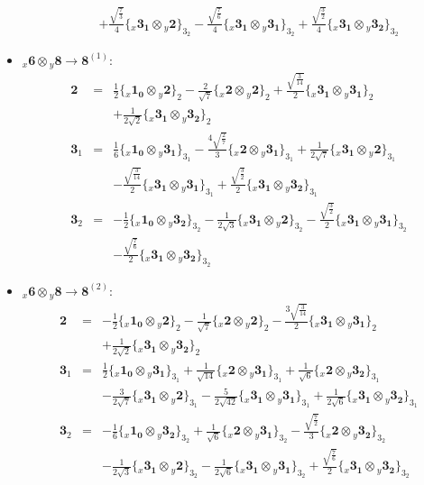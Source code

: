 \documentclass[english]{article}
\newcommand{\rep}[1]{\mathbf{#1}}
\newcommand{\repx}[2]{{}_{#2}\mathbf{#1}}
\newcommand{\subcg}[3]{\big\{ \repx{#1}{x}\otimes\repx{#2}{y}\big\}^{}_{#3}}
\begin{document}
\begin{itemize}
\begin{eqnarray*}
 & & +\frac{\sqrt{\frac{7}{3}}}{4}\subcg{3_{1}}{2}{3_{2}}-\frac{\sqrt{\frac{7}{6}}}{4}\subcg{3_{1}}{3_{1}}{3_{2}}+\frac{\sqrt{\frac{3}{2}}}{4}\subcg{3_{1}}{3_{2}}{3_{2}}
\end{eqnarray*}
\item $\repx{6}{x}\otimes\repx{8}{y}\to\rep{8}^{(1)}$:
\begin{eqnarray*}
\rep{2} &=& \frac{1}{2}\subcg{1_{0}}{2}{2}-\frac{2}{\sqrt{7}}\subcg{2}{2}{2}+\frac{\sqrt{\frac{3}{14}}}{2}\subcg{3_{1}}{3_{1}}{2} \\ 
 & & +\frac{1}{2 \sqrt{2}}\subcg{3_{1}}{3_{2}}{2}
\\
\rep{3}_{1} &=& \frac{1}{6}\subcg{1_{0}}{3_{1}}{3_{1}}-\frac{4 \sqrt{\frac{2}{7}}}{3}\subcg{2}{3_{1}}{3_{1}}+\frac{1}{2 \sqrt{7}}\subcg{3_{1}}{2}{3_{1}} \\ 
 & & -\frac{\sqrt{\frac{3}{14}}}{2}\subcg{3_{1}}{3_{1}}{3_{1}}+\frac{\sqrt{\frac{3}{2}}}{2}\subcg{3_{1}}{3_{2}}{3_{1}}
\\
\rep{3}_{2} &=& -\frac{1}{2}\subcg{1_{0}}{3_{2}}{3_{2}}-\frac{1}{2 \sqrt{3}}\subcg{3_{1}}{2}{3_{2}}-\frac{\sqrt{\frac{3}{2}}}{2}\subcg{3_{1}}{3_{1}}{3_{2}} \\ 
 & & -\frac{\sqrt{\frac{7}{6}}}{2}\subcg{3_{1}}{3_{2}}{3_{2}}
\end{eqnarray*}
\item $\repx{6}{x}\otimes\repx{8}{y}\to\rep{8}^{(2)}$:
\begin{eqnarray*}
\rep{2} &=& -\frac{1}{2}\subcg{1_{0}}{2}{2}-\frac{1}{\sqrt{7}}\subcg{2}{2}{2}-\frac{3 \sqrt{\frac{3}{14}}}{2}\subcg{3_{1}}{3_{1}}{2} \\ 
 & & +\frac{1}{2 \sqrt{2}}\subcg{3_{1}}{3_{2}}{2}
\\
\rep{3}_{1} &=& \frac{1}{2}\subcg{1_{0}}{3_{1}}{3_{1}}+\frac{1}{\sqrt{14}}\subcg{2}{3_{1}}{3_{1}}+\frac{1}{\sqrt{6}}\subcg{2}{3_{2}}{3_{1}} \\ 
 & & -\frac{3}{2 \sqrt{7}}\subcg{3_{1}}{2}{3_{1}}-\frac{5}{2 \sqrt{42}}\subcg{3_{1}}{3_{1}}{3_{1}}+\frac{1}{2 \sqrt{6}}\subcg{3_{1}}{3_{2}}{3_{1}}
\\
\rep{3}_{2} &=& -\frac{1}{6}\subcg{1_{0}}{3_{2}}{3_{2}}+\frac{1}{\sqrt{6}}\subcg{2}{3_{1}}{3_{2}}-\frac{\sqrt{\frac{7}{2}}}{3}\subcg{2}{3_{2}}{3_{2}} \\ 
 & & -\frac{1}{2 \sqrt{3}}\subcg{3_{1}}{2}{3_{2}}-\frac{1}{2 \sqrt{6}}\subcg{3_{1}}{3_{1}}{3_{2}}+\frac{\sqrt{\frac{7}{6}}}{2}\subcg{3_{1}}{3_{2}}{3_{2}}
\end{eqnarray*}
\end{itemize}
\end{document}
